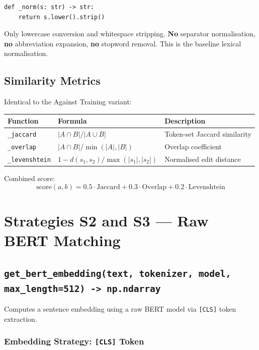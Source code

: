 ﻿\documentclass[12pt,a4paper]{article}
\begin{document}
\begin{lstlisting}
def _norm(s: str) -> str:
    return s.lower().strip()
\end{lstlisting}

Only lowercase conversion and whitespace stripping. \textbf{No} separator normalisation, \textbf{no} abbreviation expansion, \textbf{no} stopword removal. This is the baseline lexical normalisation.

\subsection{Similarity Metrics}

Identical to the Against Training variant:

\begin{longtable}{@{}P{3cm}P{4cm}P{8.5cm}@{}}
\toprule
\textbf{Function} & \textbf{Formula} & \textbf{Description} \\
\midrule
\endhead
\texttt{\_jaccard} & $|A \cap B| / |A \cup B|$ & Token-set Jaccard similarity \\
\texttt{\_overlap} & $|A \cap B| / \min(|A|,|B|)$ & Overlap coefficient \\
\texttt{\_levenshtein} & $1 - d(s_1,s_2) / \max(|s_1|,|s_2|)$ & Normalised edit distance \\
\bottomrule
\end{longtable}

Combined score:
\begin{equation}
  \text{score}(a,b) = 0.5 \cdot \text{Jaccard} + 0.3 \cdot \text{Overlap} + 0.2 \cdot \text{Levenshtein}
\end{equation}

\clearpage
\section{Strategies S2 and S3 --- Raw BERT Matching}

\subsection{\texttt{get\_bert\_embedding(text, tokenizer, model, max\_length=512) -> np.ndarray}}

Computes a sentence embedding using a raw BERT model via \texttt{[CLS]} token extraction.

\subsubsection*{Embedding Strategy: \texttt{[CLS]} Token}
\end{document}
